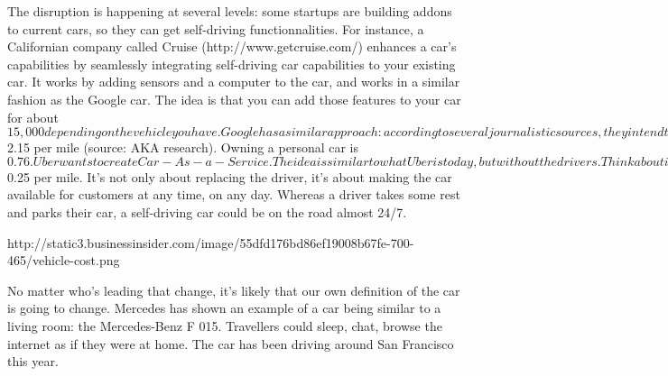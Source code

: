 \documentclass[12pt]{article}
\begin{document}
The disruption is happening at several levels: some startups are building addons to current cars, so they can get self-driving functionnalities. For instance, a Californian company called Cruise (http://www.getcruise.com/) enhances a car's capabilities by seamlessly integrating self-driving car capabilities to your existing car. It works by adding sensors and a computer to the car, and works in a similar fashion as the Google car. The idea is that you can add those features to your car for about $15,000 depending on the vehicle you have. 
Google has a similar approach: according to several journalistic sources, they intend to resell their self-driving technologies to automotive companies. Though, many people fear that Google will have a significant bargaining advantage, as those car companies don't have the technology yet. 

Some other companies intend to replace current car makers. Tesla is the best example in the category. Though the company CEO, Elon Musk, is confident self-driving cars will hit the market by 2020, there were no public statement about Tesla building such cars. In a recent video, he was asked whether Tesla would be willing to provide Uber with self-driving cars, and declined to answer. Many reporters concluded that Tesla will likely be the first company to sell autonomous cars, that were built in-house. Similar to Tesla, there could be new car giants rising by leverging the opportunity to build both a new type of car and a powerful self-driving technology. 

Finally, the most ambitious model is probably the one by Uber. The idea behind it is that using UberX costs about $2.15 per mile (source: AKA research). Owning a personal car is $0.76. Uber wants to create Car-As-a-Service. The idea is similar to what Uber is today, but without the drivers. Think about it for a moment. The car driver accounts for most of the cost of an UberX ride. Therefore, if you can remove the driver, the cost would be $0.25 per mile. It's not only about replacing the driver, it's about making the car available for customers at any time, on any day. Whereas a driver takes some rest and parks their car, a self-driving car could be on the road almost 24/7.  

http://static3.businessinsider.com/image/55dfd176bd86ef19008b67fe-700-465/vehicle-cost.png

No matter who's leading that change, it's likely that our own definition of the car is going to change. Mercedes has shown an example of a car being similar to a living room: the Mercedes-Benz F 015. Travellers could sleep, chat, browse the internet as if they were at home. The car has been driving around San Francisco this year. 
\end{document}
